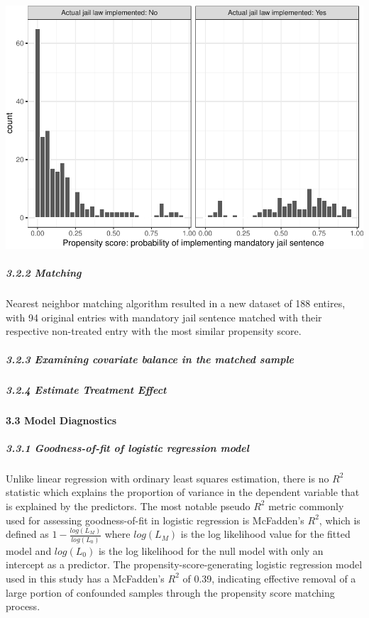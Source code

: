 \documentclass[]{article}
\let\oldparagraph\paragraph
\renewcommand{\paragraph}[1]{\oldparagraph{#1}\mbox{}}
\let\oldsubparagraph\subparagraph
\renewcommand{\subparagraph}[1]{\oldsubparagraph{#1}\mbox{}}
\begin{document}
\includegraphics{Project3_Rongkui_files/figure-latex/unnamed-chunk-16-1.pdf}

\hypertarget{matching-1}{%
\subparagraph{3.2.2 Matching}\label{matching-1}}

Nearest neighbor matching algorithm resulted in a new dataset of 188 entires, with 94 original entries with mandatory jail sentence matched with their respective non-treated entry with the most similar propensity score.

\hypertarget{examining-covariate-balance-in-the-matched-sample-2}{%
\subparagraph{3.2.3 Examining covariate balance in the matched sample}\label{examining-covariate-balance-in-the-matched-sample-2}}

\hypertarget{estimate-treatment-effect-1}{%
\subparagraph{3.2.4 Estimate Treatment Effect}\label{estimate-treatment-effect-1}}

\hypertarget{model-diagnostics-1}{%
\paragraph{3.3 Model Diagnostics}\label{model-diagnostics-1}}

\hypertarget{goodness-of-fit-of-logistic-regression-model}{%
\subparagraph{3.3.1 Goodness-of-fit of logistic regression model}\label{goodness-of-fit-of-logistic-regression-model}}

Unlike linear regression with ordinary least squares estimation, there is no \(R^2\) statistic which explains the proportion of variance in the dependent variable that is explained by the predictors. The most notable pseudo \(R^2\) metric commonly used for assessing goodness-of-fit in logistic regression is McFadden's \(R^2\), which is defined as \(1−\frac{log(L_M)}{log(L_0)}\) where \(log(L_M)\) is the log likelihood value for the fitted model and \(log(L_0)\) is the log likelihood for the null model with only an intercept as a predictor. The propensity-score-generating logistic regression model used in this study has a McFadden's \(R^2\) of 0.39, indicating effective removal of a large portion of confounded samples through the propensity score matching process.
\end{document}
